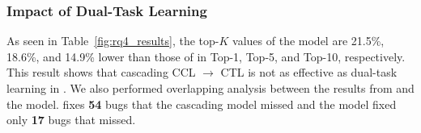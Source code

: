 



\subsubsection{\bf Impact of Dual-Task Learning}
\label{ccl:sec}

As seen in Table~\ref{fig:rq4_results}, the top-$K$ values of the
 model are 21.5\%, 18.6\%, and 14.9\% lower than those
of {\tool} in Top-1, Top-5, and Top-10, respectively. This result
shows that cascading CCL $\rightarrow$ CTL is not as effective as dual-task
learning in {\tool}.
%
%
We also performed overlapping analysis between the results from
{\tool} and the  model. {\tool} fixes {\bf 54} bugs
that the cascading model missed and the  model fixed
only {\bf 17} bugs that {\tool} missed.

